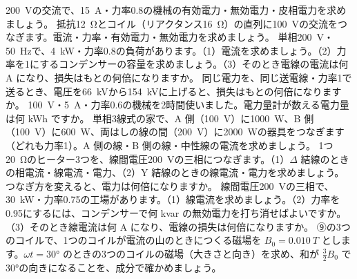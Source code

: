 \bkendproblems
{}
\bkproblem \qty{200}{V}の交流で、\qty{15}{A}・力率0.8の機械の有効電力・無効電力・皮相電力を求めましょう。
\bkproblem 抵抗\qty{12}{\ohm}とコイル（リアクタンス\qty{16}{\ohm}）の直列に\qty{100}{V}の交流をつなぎます。電流・力率・有効電力・無効電力を求めましょう。
\bkproblem 単相\qty{200}{V}・\qty{50}{Hz}で、\qty{4}{kW}・力率0.8の負荷があります。（1）電流を求めましょう。（2）力率を1にするコンデンサーの容量を求めましょう。（3）そのとき電線の電流は何 A になり、損失はもとの何倍になりますか。
\bkproblem 同じ電力を、同じ送電線・力率1で送るとき、電圧を\qty{66}{kV}から\qty{154}{kV}に上げると、損失はもとの何倍になりますか。
\bkproblem \qty{100}{V}・\qty{5}{A}・力率0.6の機械を2時間使いました。電力量計が数える電力量は何 kWh ですか。
\bkproblem 単相3線式の家で、A 側（\qty{100}{V}）に\qty{1000}{W}、B 側（\qty{100}{V}）に\qty{600}{W}、両はしの線の間（\qty{200}{V}）に\qty{2000}{W}の器具をつなぎます（どれも力率1）。A 側の線・B 側の線・中性線の電流を求めましょう。
\bkproblem 1つ\qty{20}{\ohm}のヒーター3つを、線間電圧\qty{200}{V}の三相につなぎます。（1）$\Delta$ 結線のときの相電流・線電流・電力、（2）Y 結線のときの線電流・電力を求めましょう。つなぎ方を変えると、電力は何倍になりますか。
\bkproblem 線間電圧\qty{200}{V}の三相で、\qty{30}{kW}・力率0.75の工場があります。（1）線電流を求めましょう。（2）力率を0.95にするには、コンデンサーで何 kvar の無効電力を打ち消せばよいですか。（3）そのとき線電流は何 A になり、電線の損失は何倍になりますか。
\bkproblem ⑨の3つのコイルで、1つのコイルが電流の山のときにつくる磁場を $B_0=\qty{0.010}{T}$ とします。$\omega t=30°$ のときの3つのコイルの磁場（大きさと向き）を求め、和が $\tfrac32B_0$ で30°の向きになることを、成分で確かめましょう。
